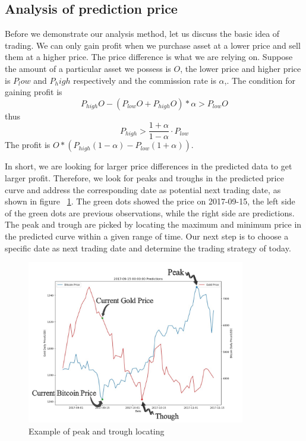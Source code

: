 \documentclass{mcmthesis}
\begin{document}
\subsection{Analysis of prediction price}
Before we demonstrate our analysis method, let us discuss the basic idea of trading. We can only gain profit when we purchase asset at a lower price and sell them at a higher price. The price difference is what we are relying on. Suppose the amount of a particular asset we possess is $O$, the lower price and higher price is $P_low$ and $P_high$ respectively and the commission rate is $\alpha$,. The condition for gaining profit is
\begin{equation}
    P_{high}O - (P_{low}O + P_{high}O)*\alpha > P_{low}O
\end{equation}
thus
\begin{equation}
    P_{high} > \frac{1+\alpha}{1-\alpha}·P_{low}
\end{equation}
The profit is ${O*(P_{high}(1-\alpha) - P_{low}(1+\alpha))}$.


In short, we are looking for larger price differences in the predicted data to get larger profit. Therefore, we look for peaks and troughs in the predicted price curve and address the corresponding date as potential next trading date, as shown in figure ~\ref{fig:example of peak and trough locating}. The green dots showed the price on 2017-09-15, the left side of the green dots are previous observations, while the right side are predictions. The peak and trough are picked by locating the maximum and minimum price in the predicted curve within a given range of time. Our next step is to choose a specific date as next trading date and determine the trading strategy of today.


\begin{figure}[htb]
\centering
\includegraphics[width =  0.85\textwidth]{fig/example of peak and trough locating.png}
\caption{Example of peak and trough locating}
\label{fig:example of peak and trough locating}
\end{figure}
\end{document}

